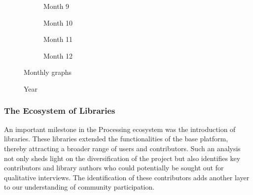 \documentclass{article}
\begin{document}
\begin{figure}[htbp]
  \vspace{0.25cm}

  \begin{subfigure}[b]{0.24\textwidth}
    
      \caption{Month 9}
      \label{fig:month9}
  \end{subfigure}
  \hfill
  \begin{subfigure}[b]{0.24\textwidth}
    
      \caption{Month 10}
      \label{fig:month10}
  \end{subfigure}
  \hfill
  \begin{subfigure}[b]{0.24\textwidth}
    
      \caption{Month 11}
      \label{fig:month11}
  \end{subfigure}
  \hfill
  \begin{subfigure}[b]{0.24\textwidth}
    
      \caption{Month 12}
      \label{fig:month12}
  \end{subfigure}
  
  \caption{Monthly graphs}
  \label{fig:monthlyGraphs}
\end{figure}


\begin{figure}[h!] 
  \centering 
  
  \caption{Year}
  \label{figure:year}  
\end{figure}

\subsubsection*{The Ecosystem of Libraries}
An important milestone in the Processing ecosystem was the introduction of libraries. These libraries extended the functionalities of the base platform, thereby attracting a broader range of users and contributors. Such an analysis not only sheds light on the diversification of the project but also identifies key contributors and library authors who could potentially be sought out for qualitative interviews. The identification of these contributors adds another layer to our understanding of community participation.
\end{document}
